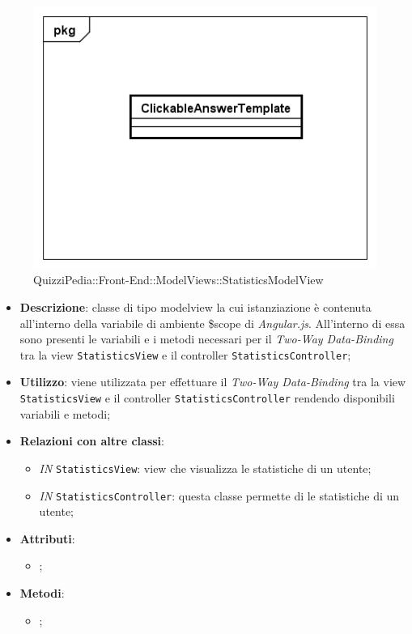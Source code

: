 \begin{figure}[ht]
	\centering
	\includegraphics[scale=0.5,keepaspectratio]{UML/Classi/Front-End/QuizziPedia_Front-end_Templates_ClickableAnswerTemplate.png}
	\caption{QuizziPedia::Front-End::ModelViews::StatisticsModelView}
\end{figure} \FloatBarrier

\begin{itemize}
	\item \textbf{Descrizione}: classe di tipo modelview la cui istanziazione è contenuta all'interno della variabile di ambiente \$scope di \textit{Angular.js}. All'interno di essa sono presenti le variabili e i metodi necessari per il \textit{Two-Way Data-Binding} tra la view \texttt{StatisticsView} e il controller \texttt{StatisticsController};
	\item \textbf{Utilizzo}: viene utilizzata per effettuare il \textit{Two-Way Data-Binding} tra la view \texttt{StatisticsView} e il controller \texttt{StatisticsController} rendendo disponibili variabili e metodi;
	\item \textbf{Relazioni con altre classi}: 
	\begin{itemize}
		\item \textit{IN} \texttt{StatisticsView}: view che visualizza le statistiche di un utente; 
		\item \textit{IN} \texttt{StatisticsController}: questa classe permette di le statistiche di un utente;
	\end{itemize}
	\item \textbf{Attributi}: 
	\begin{itemize}
		\item ;
	\end{itemize}
	\item \textbf{Metodi}: 
	\begin{itemize}
		\item ;
	\end{itemize}
\end{itemize}	

